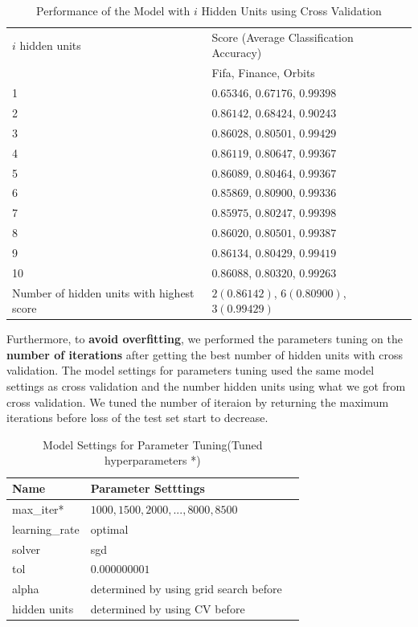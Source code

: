\documentclass{article}
\begin{document}
\begin{table}[htb]
	\caption{Performance of the Model with $i$ Hidden Units using Cross Validation}
	\label{sample-table}
	\centering
	\begin{tabular}{lll}
		\toprule
		\cmidrule{1-2}
		$i$ hidden units    &  Score (Average Classification Accuracy)	\\
		\cmidrule{1-2}
		 &  Fifa, Finance, Orbits	\\
		\midrule
		1 & $0.65346$, $0.67176$, $0.99398$ \\
		2 & $0.86142$, $0.68424$, $0.90243$ \\
		3 & $0.86028$, $0.80501$, $0.99429$ \\
		4 & $0.86119$, $0.80647$, $0.99367$ \\
		5 & $0.86089$, $0.80464$, $0.99367$ \\
		6 & $0.85869$, $0.80900$, $0.99336$ \\
		7 & $0.85975$, $0.80247$, $0.99398$ \\
		8 & $0.86020$, $0.80501$, $0.99387$ \\
		9 & $0.86134$, $0.80429$, $0.99419$ \\
		10 & $0.86088$, $0.80320$, $0.99263$ \\
		\midrule
		Number of hidden units with highest score & $2 (0.86142)$, $6 (0.80900)$, $3 (0.99429)$ \\
		\bottomrule
	\end{tabular}
\end{table}

Furthermore, to \textbf{avoid overfitting}, we performed the parameters tuning on the \textbf{number of iterations} after getting the best number of hidden units with cross validation. The model settings for parameters tuning 
used the same model settings as cross validation and the number hidden units using what we got from cross validation. We tuned the number of iteraion by returning the maximum iterations before loss of the test set start to decrease. 

\begin{table}[htb]
	\caption{Model Settings for Parameter Tuning(Tuned hyperparameters *)}
	\label{sample-table}
	\centering
	\begin{tabular}{lll}
		\toprule
		\cmidrule{1-2}
		Name     &  Parameter Setttings	\\
		\midrule
		max\_iter* & $1000,1500,2000,...,8000,8500$  \\
		learning\_rate & optimal  \\
		solver & sgd  \\
		tol & $0.000000001$        \\
		alpha & determined by using grid search before   \\
		hidden units & determined by using CV before     \\
		\bottomrule
	\end{tabular}
\end{table}
\end{document}
